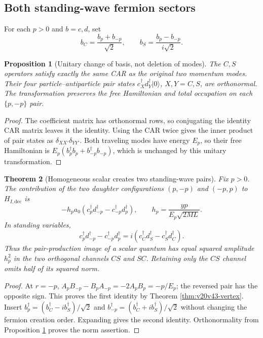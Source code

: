 \documentclass[11pt]{article}
\newtheorem{theorem}{Theorem}[section]
\newtheorem{proposition}[theorem]{Proposition}
\theoremstyle{remark}
\begin{document}
\subsection{Both standing-wave fermion sectors}

For each \(p>0\) and \(b=c,d\), set
\[
 b_C=\frac{b_p+b_{-p}}{\sqrt2},\qquad
 b_S=\frac{b_p-b_{-p}}{i\sqrt2}.
\]

\begin{proposition}[Unitary change of basis, not deletion of modes]
\label{prop:v20v43-car}
The \(C,S\) operators satisfy exactly the same CAR as the original
two momentum modes.  Their four particle--antiparticle pair states
\(c_X^\dagger d_Y^\dagger|0\rangle\), \(X,Y=C,S\), are orthonormal.
The transformation preserves the free Hamiltonian and total occupation
on each \(\{p,-p\}\) pair.
\end{proposition}
\begin{proof}
The coefficient matrix has orthonormal rows, so conjugating the
identity CAR matrix leaves it the identity.  Using the CAR twice gives
the inner product of pair states as \(\delta_{XX'}\delta_{YY'}\).
Both traveling modes have energy \(E_p\), so their free Hamiltonian
is \(E_p(b_p^\dagger b_p+b_{-p}^\dagger b_{-p})\), which is
unchanged by this unitary transformation.
\end{proof}

\begin{theorem}[Homogeneous scalar creates two standing-wave pairs]
\label{thm:v20v43-leak}
Fix \(p>0\).  The contribution of the two daughter configurations
\((p,-p)\) and \((-p,p)\) to \(H_{I,\mathrm{dec}}\) is
\[
 -h_p a_0(c_p^\dagger d_{-p}^\dagger-c_{-p}^\dagger d_p^\dagger),
 \qquad h_p=\frac{yp}{E_p\sqrt{2ML}}.
\]
In standing variables,
\[
 c_p^\dagger d_{-p}^\dagger-c_{-p}^\dagger d_p^\dagger
 =i(c_C^\dagger d_S^\dagger-c_S^\dagger d_C^\dagger).
\]
Thus the pair-production image of a scalar quantum has equal squared
amplitude \(h_p^2\) in the two orthogonal channels \(CS\) and \(SC\).
Retaining only the \(CS\) channel omits half of its squared norm.
\end{theorem}
\begin{proof}
At \(r=-p\),
\(A_pB_{-p}-B_pA_{-p}=-2A_pB_p=-p/E_p\);
the reversed pair has the opposite sign.  This proves the first
identity by Theorem \ref{thm:v20v43-vertex}.
Insert
\(b_p^\dagger=(b_C^\dagger-i b_S^\dagger)/\sqrt2\) and
\(b_{-p}^\dagger=(b_C^\dagger+i b_S^\dagger)/\sqrt2\)
without changing the fermion creation order.  Expanding gives the
second identity.  Orthonormality from Proposition
\ref{prop:v20v43-car} proves the norm assertion.
\end{proof}
\end{document}
